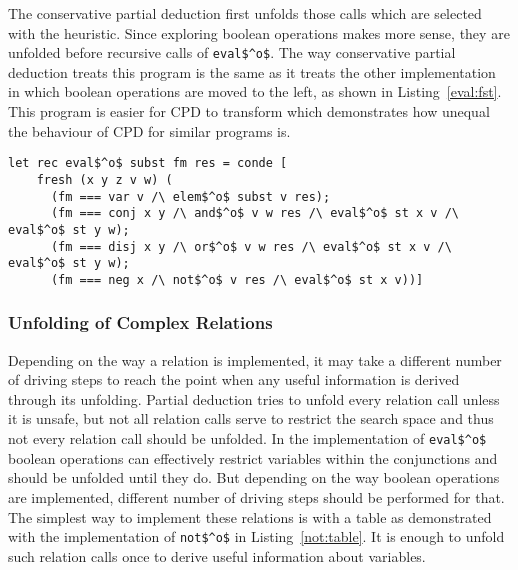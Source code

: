 The conservative partial deduction first unfolds those calls which are selected with the heuristic.
Since exploring boolean operations makes more sense, they are unfolded before recursive calls of \lstinline{eval$^o$}.
The way conservative partial deduction treats this program is the same as it treats the other implementation in which boolean operations are moved to the left, as shown in Listing~\ref{eval:fst}.
This program is easier for CPD to transform which demonstrates how unequal the behaviour of CPD for similar programs is.

\begin{figure*}[!h]
  \centering
  \begin{minipage}{0.85\textwidth}
    \begin{lstlisting}[label={eval:fst}, caption={Evaluator of formulas with boolean operation second}, captionpos=b, frame=tb]
  let rec eval$^o$ subst fm res = conde [
    fresh (x y z v w) (
      (fm === var v /\ elem$^o$ subst v res);
      (fm === conj x y /\ and$^o$ v w res /\ eval$^o$ st x v /\ eval$^o$ st y w);
      (fm === disj x y /\ or$^o$ v w res /\ eval$^o$ st x v /\ eval$^o$ st y w);
      (fm === neg x /\ not$^o$ v res /\ eval$^o$ st x v))]
    \end{lstlisting}
  \end{minipage}
\end{figure*}

\subsubsection{Unfolding of Complex Relations}

Depending on the way a relation is implemented, it may take a different number of driving steps to reach the point when any useful information is derived through its unfolding.
Partial deduction tries to unfold every relation call unless it is unsafe, but not all relation calls serve to restrict the search space and thus not every relation call should be unfolded.
In the implementation of \lstinline{eval$^o$} boolean operations can effectively restrict variables within the conjunctions and should be unfolded until they do.
But depending on the way boolean operations are implemented, different number of driving steps should be performed for that.
The simplest way to implement these relations is with a table as demonstrated with the implementation of \lstinline{not$^o$} in Listing~\ref{not:table}.
It is enough to unfold such relation calls once to derive useful information about variables.

